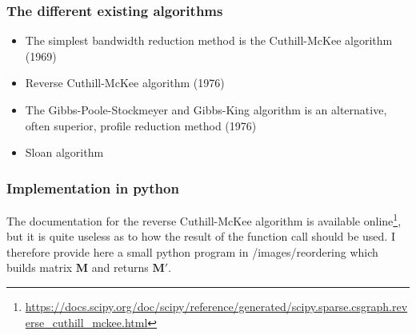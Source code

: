 \subsubsection*{The different existing algorithms}

\begin{itemize}
\item The simplest bandwidth reduction method is the Cuthill-McKee algorithm (1969) \cite{cumc69}

\item Reverse Cuthill-McKee algorithm (1976) \cite{gibbs76}

\item The Gibbs-Poole-Stockmeyer and Gibbs-King algorithm is
an alternative, often superior, profile reduction method (1976) \cite{gips76}


\item Sloan algorithm \cite{sloan86,sloan89}

\end{itemize}



\subsubsection*{Implementation in python}

The documentation for the reverse Cuthill-McKee algorithm is available online\footnote{
\url{https://docs.scipy.org/doc/scipy/reference/generated/scipy.sparse.csgraph.reverse_cuthill_mckee.html}},
but it is quite useless as to how the result of the function call should be used. 
I therefore provide here a small python program in /images/reordering which builds
matrix ${\bm M}$ and returns ${\bm M}'$. 

